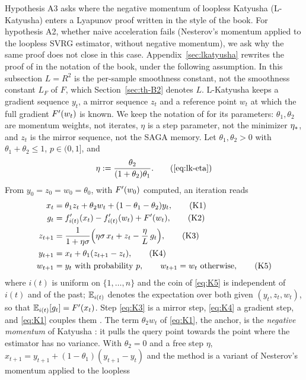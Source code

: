 Hypothesis A3 asks where the negative momentum of loopless Katyusha (L-Katyusha) \cite{kovalev2020dont} enters a
Lyapunov proof written in the style of the book. For hypothesis A2, whether naive acceleration fails (Nesterov's
momentum applied to the loopless SVRG estimator, without negative momentum), we ask why the same proof does not close in
this case. Appendix~\ref{sec:lkatyusha} rewrites the proof of \cite{kovalev2020dont} in the notation of the book, under
the following assumption.
In this subsection $L=R^2$ is the per-sample smoothness constant, not the smoothness constant $L_F$ of $F$, which
Section~\ref{sec:th-B2} denotes $L$.
L-Katyusha keeps a gradient sequence $y_t$, a mirror sequence $z_t$ and a reference point $w_t$ at which the full
gradient $F'(w_t)$ is known. We keep the notation of \cite{kovalev2020dont} for its parameters: $\theta_1,\theta_2$ are
momentum weights, not iterates, $\eta$ is a step parameter, not the minimizer $\eta_\ast$, and $z_t$ is the mirror
sequence, not the SAGA memory. Let $\theta_1,\theta_2>0$ with $\theta_1+\theta_2\le1$, $p\in(0,1]$, and
\begin{equation*}
\eta:=\frac{\theta_2}{(1+\theta_2)\theta_1}.\tag{\ref*{eq:lk-eta}}
\end{equation*}
From $y_0=z_0=w_0=\theta_0$, with $F'(w_0)$ computed, an iteration reads
\begin{align*}
x_t &= \theta_1 z_t+\theta_2 w_t+(1-\theta_1-\theta_2)y_t, \tag{K1}\\
g_t &= f'_{i(t)}(x_t)-f'_{i(t)}(w_t)+\Fp(w_t), \tag{K2}\\
z_{t+1} &= \frac1{1+\eta\sigma}\Big(\eta\sigma\,x_t+z_t-\frac\eta L\,g_t\Big), \tag{K3}\\
y_{t+1} &= x_t+\theta_1(z_{t+1}-z_t), \tag{K4}\\
w_{t+1} &= y_t\ \text{with probability $p$},\qquad w_{t+1}=w_t\ \text{otherwise}, \tag{K5}
\end{align*}
where $i(t)$ is uniform on $\{1,\dots,n\}$ and the coin of \eqref{eq:K5} is independent of $i(t)$ and of the past;
$\mathbb{E}_{i(t)}$ denotes the expectation over both given $(y_t,z_t,w_t)$, so that $\mathbb{E}_{i(t)}[g_t]=F'(x_t)$. Step \eqref{eq:K3} is a
mirror step, \eqref{eq:K4} a gradient step, and \eqref{eq:K1} couples them \cite{allenzhu2017linear}. The term
$\theta_2w_t$ of \eqref{eq:K1}, the anchor, is the \emph{negative momentum} of Katyusha \cite{allenzhu2018katyusha}: it
pulls the query point towards the point where the estimator has no variance. With $\theta_2=0$ and a free step $\eta$,
$x_{t+1}=y_{t+1}+(1-\theta_1)(y_{t+1}-y_t)$ and the method is a variant of Nesterov's momentum applied to the loopless
